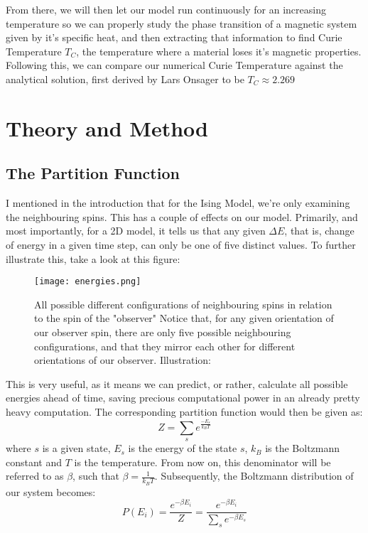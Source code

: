 \documentclass{article}
\begin{document}
From there, we will then let our model run continuously for an increasing temperature so we can properly study the phase transition of a magnetic system given by it's specific heat, and then extracting that information to find Curie Temperature $T_C$, the temperature where a material loses it's magnetic properties. Following this, we can compare our numerical Curie Temperature against the analytical solution, first derived by Lars Onsager\cite{lars} to be $T_C \approx 2.269$ \newpage
\section{Theory and Method}
\subsection{The Partition Function}
I mentioned in the introduction that for the Ising Model, we're only examining the neighbouring spins. This has a couple of effects on our model. Primarily, and most importantly, for a 2D model, it tells us that any given $\Delta E$, that is, change of energy in a given time step, can only be one of five distinct values. To further illustrate this, take a look at this figure:
\begin{figure}[ht!]
    \centering
    \texttt{[image: energies.png]}
    \caption{All possible different configurations of neighbouring spins in relation to the spin of the "observer"\newline
    Notice that, for any given orientation of our observer spin, there are only five possible neighbouring configurations, and that they mirror each other for different orientations of our observer.
    \newline Illustration: \cite{lecnotes}}
    \label{figEn}
\end{figure}
This is very useful, as it means we can predict, or rather, calculate all possible energies ahead of time, saving precious computational power in an already pretty heavy computation. \newline
The corresponding partition function would then be given as:
\begin{equation}
    Z = \sum_s e^{\frac{-E_s}{k_B T}}
\end{equation}
where $s$ is a given state, $E_s$ is the energy of the state $s$, $k_B$ is the Boltzmann constant and $T$ is the temperature. From now on, this denominator will be referred to as $\beta$, such that $\beta = \frac{1}{k_B T}$.
\newline Subsequently, the Boltzmann distribution of our system becomes:
\begin{equation}
    P(E_i) = \frac{e^{-\beta E_i}}{Z} = \frac{e^{-\beta E_i}}{\sum_s e^{-\beta E_s}}
\end{equation}
\end{document}
